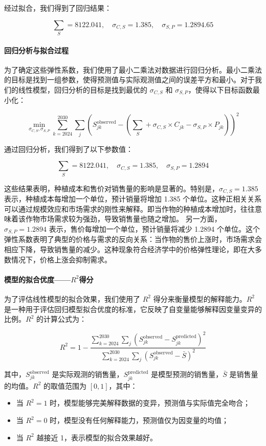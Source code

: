 \documentclass[12pt,a4paper]{nmmcm}
\begin{document}
经过拟合，我们得到了回归结果：

\[
  \sum_S = 8122.041, \quad \sigma_{C,S} = 1.385, \quad \sigma_{S,P} = 1.2894.65
\]

\paragraph{回归分析与拟合过程}

为了确定这些弹性系数，我们使用了最小二乘法对数据进行回归分析。最小二乘法的目标是找到一组参数，使得预测值与实际观测值之间的误差平方和最小。对于我们的线性模型，回归分析的目标是找到最优的 $\sigma_{C,S}$ 和 $\sigma_{S,P}$，使得以下目标函数最小化：

\[
  \min_{\sigma_{C,S}, \sigma_{S,P}} \sum_{k=2024}^{2030} \sum_{j} \left( S_{jk}^{\text{observed}} - \left( \sum_S + \sigma_{C,S} \times C_{jk} - \sigma_{S,P} \times P_{jk} \right) \right)^2
\]

通过回归分析，我们得到了以下参数值：

\[
  \sum_S = 8122.041, \quad \sigma_{C,S} = 1.385, \quad \sigma_{S,P} = 1.2894
\]

这些结果表明，种植成本和售价对销售量的影响是显著的。特别是，$\sigma_{C,S} = 1.385$ 表示，种植成本每增加一个单位，预计销量将增加 1.385 个单位。这种正相关关系可以通过规模效应和市场需求的刚性来解释。即当作物的种植成本增加时，往往意味着该作物市场需求较为强劲，导致销售量也随之增加。
另一方面，$\sigma_{S,P} = 1.2894$ 表示，售价每增加一个单位，预计销量将减少 1.2894 个单位。这个弹性系数表明了典型的价格与需求的反向关系：当作物的售价上涨时，市场需求会相应下降，导致销售量的减少。这种现象符合经济学中的价格弹性理论，即在大多数情况下，价格上涨会抑制需求。

\paragraph{模型的拟合优度——$R^2$得分}

为了评估线性模型的拟合效果，我们使用了 $R^2$ 得分来衡量模型的解释能力。$R^2$ 是一种用于评估回归模型拟合优度的标准，它反映了自变量能够解释因变量变异的比例。$R^2$ 的计算公式为：

\[
  R^2 = 1 - \frac{\sum_{k=2024}^{2030} \sum_{j} \left( S_{jk}^{\text{observed}} - S_{jk}^{\text{predicted}} \right)^2}{\sum_{k=2024}^{2030} \sum_{j} \left( S_{jk}^{\text{observed}} - \bar{S} \right)^2}
\]

其中，$S_{jk}^{\text{observed}}$ 是实际观测的销售量，$S_{jk}^{\text{predicted}}$ 是模型预测的销售量，$\bar{S}$ 是销售量的均值。$R^2$ 的取值范围为 $[0,1]$，其中：
\begin{itemize}
  \item 当 $R^2 = 1$ 时，模型能够完美解释数据的变异，预测值与实际值完全吻合；
  \item 当 $R^2 = 0$ 时，模型没有任何解释能力，预测值仅为因变量的均值；
  \item 当 $R^2$ 越接近 1，表示模型的拟合效果越好。
\end{itemize}
\end{document}
